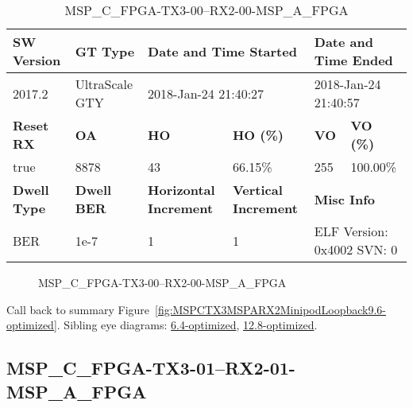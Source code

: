 \begin{table}[h]
\centering
\caption{MSP\_C\_FPGA-TX3-00--RX2-00-MSP\_A\_FPGA}
\label{tab:MSPCFPGATX300RX200MSPAFPGA9.6-optimized}
\begin{tabular}{@{}|l|l|l|l|l|l|@{}}
\toprule
\textbf{SW Version}                & \textbf{GT Type}   & \multicolumn{2}{l|}{\textbf{Date and Time Started}}            & \multicolumn{2}{l|}{\textbf{Date and Time Ended}}        \\ \midrule
2017.2                       & UltraScale GTY          & \multicolumn{2}{l|}{2018-Jan-24 21:40:27}                   & \multicolumn{2}{l|}{2018-Jan-24 21:40:57}               \\ \midrule
\textbf{Reset RX}                  & \textbf{OA} & \textbf{HO}   & \textbf{HO (\%)} & \textbf{VO} & \textbf{VO (\%)} \\ \midrule
true & 8878        & 43          & 66.15\%        & 255        & 100.00\%       \\ \midrule
\textbf{Dwell Type}                & \textbf{Dwell BER} & \textbf{Horizontal Increment} & \textbf{Vertical Increment}    & \multicolumn{2}{l|}{\textbf{Misc Info}}                  \\ \midrule
BER                            & 1e-7        & 1        & 1           & \multicolumn{2}{l|}{ELF Version: 0x4002 SVN: 0}                         \\ \bottomrule
\end{tabular}
\end{table}

\begin{figure}[h]
\caption{MSP\_C\_FPGA-TX3-00--RX2-00-MSP\_A\_FPGA} \label{fig:MSPCFPGATX300RX200MSPAFPGA9.6-optimized}
\end{figure}

Call back to summary Figure~\ref{fig:MSPCTX3MSPARX2MinipodLoopback9.6-optimized}.
Sibling eye diagrams: \hyperref[sec:MSPCFPGATX300RX200MSPAFPGA6.4-optimized]{6.4-optimized}, \hyperref[sec:MSPCFPGATX300RX200MSPAFPGA12.8-optimized]{12.8-optimized}.

\clearpage
\newpage


\subsection{MSP\_C\_FPGA-TX3-01--RX2-01-MSP\_A\_FPGA}\label{sec:MSPCFPGATX301RX201MSPAFPGA9.6-optimized}

